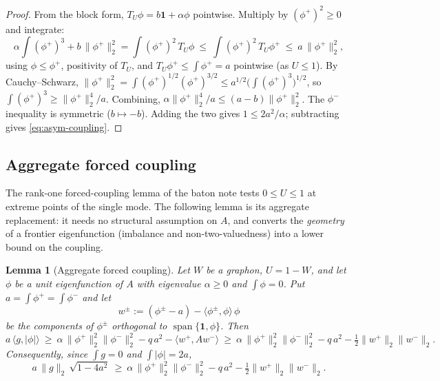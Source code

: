 \documentclass[11pt]{article}
\newtheorem{lemma}[theorem]{Lemma}
\newcommand{\one}{\mathbf 1}
\newcommand{\ip}[2]{\langle #1,#2\rangle}
\newcommand{\norm}[1]{\lVert #1\rVert}
\begin{document}
\begin{proof}
From the block form, $T_U\phi=b\one+\alpha\phi$ pointwise.  Multiply by $(\phi^+)^2\ge0$ and integrate:
\[
        \alpha\int(\phi^+)^3+b\,\norm{\phi^+}_2^2
        =\int(\phi^+)^2\,T_U\phi
        \ \le\ \int(\phi^+)^2\,T_U\phi^+
        \ \le\ a\,\norm{\phi^+}_2^2,
\]
using $\phi\le\phi^+$, positivity of $T_U$, and $T_U\phi^+\le\int\phi^+=a$ pointwise (as $U\le1$).  By Cauchy--Schwarz, $\norm{\phi^+}_2^2=\int(\phi^+)^{1/2}(\phi^+)^{3/2}\le a^{1/2}\bigl(\int(\phi^+)^3\bigr)^{1/2}$, so $\int(\phi^+)^3\ge\norm{\phi^+}_2^4/a$.  Combining, $\alpha\norm{\phi^+}_2^4/a\le(a-b)\norm{\phi^+}_2^2$.  The $\phi^-$ inequality is symmetric ($b\mapsto-b$).  Adding the two gives $1\le2a^2/\alpha$; subtracting gives \eqref{eq:asym-coupling}.
\end{proof}

\subsection{Aggregate forced coupling}

The rank-one forced-coupling lemma of the baton note tests $0\le U\le1$ at extreme points of the single mode.  The following lemma is its aggregate replacement: it needs no structural assumption on $A$, and converts the \emph{geometry} of a frontier eigenfunction (imbalance and non-two-valuedness) into a lower bound on the coupling.

\begin{lemma}[Aggregate forced coupling]\label{lem:aggregate-fc}
Let $W$ be a graphon, $U=1-W$, and let $\phi$ be a unit eigenfunction of $A$ with eigenvalue $\alpha\ge0$ and $\int\phi=0$.  Put $a=\int\phi^+=\int\phi^-$ and let
\[
        w^\pm:=(\phi^\pm-a)-\ip{\phi^\pm}{\phi}\,\phi
\]
be the components of $\phi^\pm$ orthogonal to $\operatorname{span}\{\one,\phi\}$.  Then
\begin{equation}\label{eq:agg-fc}
        a\,\ip{g}{|\phi|}\ \ge\ \alpha\,\norm{\phi^+}_2^2\norm{\phi^-}_2^2-q\,a^2-\ip{w^+}{Aw^-}
        \ \ge\ \alpha\,\norm{\phi^+}_2^2\norm{\phi^-}_2^2-q\,a^2-\tfrac12\norm{w^+}_2\norm{w^-}_2 .
\end{equation}
Consequently, since $\int g=0$ and $\int|\phi|=2a$,
\begin{equation}\label{eq:agg-fc-CS}
        a\,\norm g_2\,\sqrt{1-4a^2}\ \ge\ \alpha\,\norm{\phi^+}_2^2\norm{\phi^-}_2^2-q\,a^2-\tfrac12\norm{w^+}_2\norm{w^-}_2 .
\end{equation}
\end{lemma}
\end{document}
